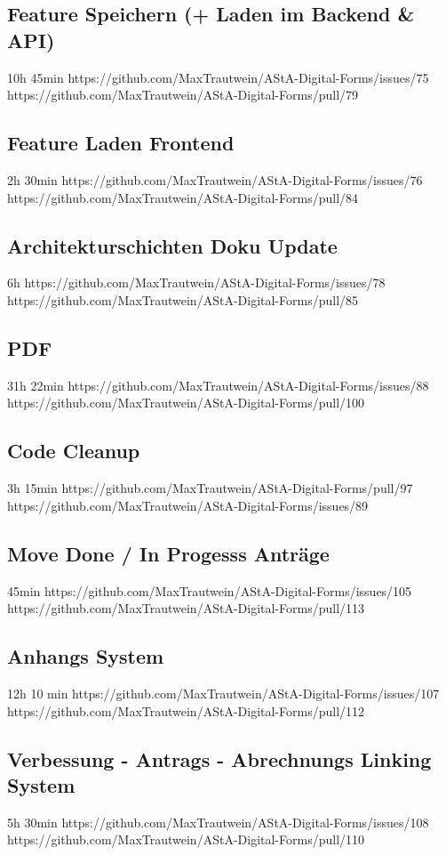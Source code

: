 \subsection{Feature Speichern (+ Laden im Backend & API)}
10h 45min
https://github.com/MaxTrautwein/AStA-Digital-Forms/issues/75
https://github.com/MaxTrautwein/AStA-Digital-Forms/pull/79
\subsection{Feature Laden Frontend}
2h 30min
https://github.com/MaxTrautwein/AStA-Digital-Forms/issues/76
https://github.com/MaxTrautwein/AStA-Digital-Forms/pull/84
\subsection{Architekturschichten Doku Update}
6h
https://github.com/MaxTrautwein/AStA-Digital-Forms/issues/78
https://github.com/MaxTrautwein/AStA-Digital-Forms/pull/85
\subsection{PDF}
31h 22min
https://github.com/MaxTrautwein/AStA-Digital-Forms/issues/88
https://github.com/MaxTrautwein/AStA-Digital-Forms/pull/100
\subsection{Code Cleanup}
3h 15min
https://github.com/MaxTrautwein/AStA-Digital-Forms/pull/97
https://github.com/MaxTrautwein/AStA-Digital-Forms/issues/89
\subsection{Move Done / In Progesss Anträge}
45min
https://github.com/MaxTrautwein/AStA-Digital-Forms/issues/105
https://github.com/MaxTrautwein/AStA-Digital-Forms/pull/113
\subsection{Anhangs System}
12h 10 min
https://github.com/MaxTrautwein/AStA-Digital-Forms/issues/107
https://github.com/MaxTrautwein/AStA-Digital-Forms/pull/112
\subsection{Verbessung - Antrags - Abrechnungs Linking System}
5h 30min
https://github.com/MaxTrautwein/AStA-Digital-Forms/issues/108
https://github.com/MaxTrautwein/AStA-Digital-Forms/pull/110
